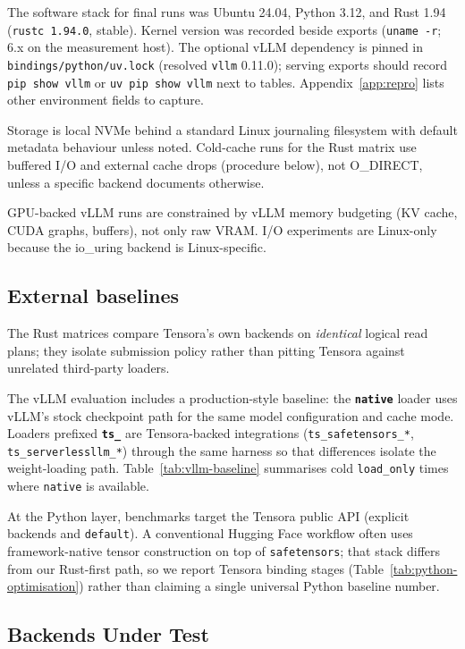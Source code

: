 The software stack for final runs was Ubuntu 24.04, Python 3.12, and Rust 1.94 (\texttt{rustc 1.94.0}, stable). Kernel version was recorded beside exports (\texttt{uname -r}; 6.x on the measurement host). The optional vLLM dependency is pinned in \texttt{bindings/python/uv.lock} (resolved \texttt{vllm} 0.11.0); serving exports should record \texttt{pip show vllm} or \texttt{uv pip show vllm} next to tables. Appendix~\ref{app:repro} lists other environment fields to capture.

Storage is local NVMe behind a standard Linux journaling filesystem with default metadata behaviour unless noted. Cold-cache runs for the Rust matrix use buffered I/O and external cache drops (procedure below), not O\_DIRECT, unless a specific backend documents otherwise.

GPU-backed vLLM runs are constrained by vLLM memory budgeting (KV cache, CUDA graphs, buffers), not only raw VRAM. I/O experiments are Linux-only because the io\_uring backend is Linux-specific.

\subsection{External baselines}

The Rust matrices compare Tensora's own backends on \emph{identical} logical read plans; they isolate submission policy rather than pitting Tensora against unrelated third-party loaders.

The vLLM evaluation includes a production-style baseline: the \textbf{\texttt{native}} loader uses vLLM's stock checkpoint path for the same model configuration and cache mode. Loaders prefixed \textbf{\texttt{ts\_}} are Tensora-backed integrations (\texttt{ts\_safetensors\_*}, \texttt{ts\_serverlessllm\_*}) through the same harness so that differences isolate the weight-loading path. Table~\ref{tab:vllm-baseline} summarises cold \texttt{load\_only} times where \texttt{native} is available.

At the Python layer, benchmarks target the Tensora public API (explicit backends and \texttt{default}). A conventional Hugging Face workflow often uses framework-native tensor construction on top of \texttt{safetensors}; that stack differs from our Rust-first path, so we report Tensora binding stages (Table~\ref{tab:python-optimisation}) rather than claiming a single universal Python baseline number.

\subsection{Backends Under Test}

